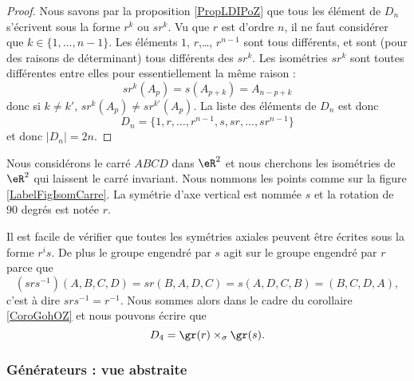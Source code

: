 \begin{proof}
    Nous savons par la proposition \ref{PropLDIPoZ} que tous les élément de \( D_n\) s'écrivent sous la forme \( r^k\) ou \( sr^k\). Vu que \( r\) est d'ordre \( n\), il ne faut considérer que \( k\in\{ 1,\ldots, n-1 \}\). Les éléments \( 1\), \( r\),\ldots, \( r^{n-1}\) sont tous différents, et sont (pour des raisons de déterminant) tous différents des \( sr^k\). Les isométries \( sr^k\) sont toutes différentes entre elles pour essentiellement la même raison :
    \begin{equation}
        sr^k(A_p)=s(A_{p+k})=A_{n-p+k}
    \end{equation}
    donc si \( k\neq k'\), \( sr^k(A_p)\neq sr^{k'}(A_p)\). La liste des éléments de \( D_n\) est donc
    \begin{equation}
        D_n=\{ 1,r,\ldots, r^{n-1},s,sr,\ldots, sr^{n-1} \}
    \end{equation}
    et donc \( | D_n |=2n\).
\end{proof}

\begin{example}
    Nous considérons le carré \( ABCD\) dans \( \eR^2\) et nous cherchons les isométries de \( \eR^2\) qui laissent le carré invariant. Nous nommons les points comme sur la figure \ref{LabelFigIsomCarre}. La symétrie d'axe vertical est nommée \( s\) et la rotation de \( 90\) degrés est notée \( r\).
    \newcommand{\CaptionFigIsomCarre}{Le carré dont nous étudions le groupe diédral.}
    

    Il est facile de vérifier que toutes les symétries axiales peuvent être écrites sous la forme \( r^is\). De plus le groupe engendré par \( s\) agit sur le groupe engendré par \( r\) parce que
    \begin{equation}
        (srs^{-1})(A,B,C,D)=sr(B,A,D,C)=s(A,D,C,B)=(B,C,D,A),
    \end{equation}
    c'est à dire \( srs^{-1}=r^{-1}\). Nous sommes alors dans le cadre du corollaire \ref{CoroGohOZ} et nous pouvons écrire que
    \begin{equation}
        D_4=\gr(r)\times_{\sigma}\gr(s).
    \end{equation}
\end{example}

\subsubsection{Générateurs : vue abstraite}


